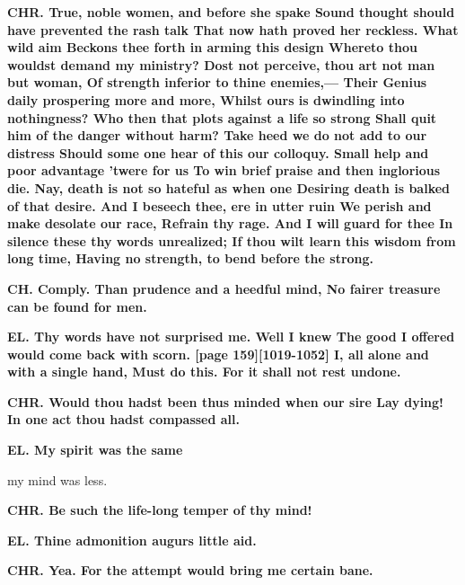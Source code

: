 \documentclass[11pt,letter]{book}
\begin{document}
\par \textbf{CHR. True, noble women, and before she spake Sound thought should have prevented the rash talk That now hath proved her reckless. What wild aim Beckons thee forth in arming this design Whereto thou wouldst demand my ministry? Dost not perceive, thou art not man but woman, Of strength inferior to thine enemies,— Their Genius daily prospering more and more, Whilst ours is dwindling into nothingness? Who then that plots against a life so strong Shall quit him of the danger without harm? Take heed we do not add to our distress Should some one hear of this our colloquy. Small help and poor advantage ’twere for us To win brief praise and then inglorious die. Nay, death is not so hateful as when one Desiring death is balked of that desire. And I beseech thee, ere in utter ruin We perish and make desolate our race, Refrain thy rage. And I will guard for thee In silence these thy words unrealized; If thou wilt learn this wisdom from long time, Having no strength, to bend before the strong.}
\par 

\par \textbf{CH. Comply. Than prudence and a heedful mind, No fairer treasure can be found for men.}
\par 

\par \textbf{EL. Thy words have not surprised me. Well I knew The good I offered would come back with scorn. [page 159][1019-1052] I, all alone and with a single hand, Must do this. For it shall not rest undone.}
\par 

\par \textbf{CHR. Would thou hadst been thus minded when our sire Lay dying! In one act thou hadst compassed all.}
\par 

\par \textbf{EL. My spirit was the same}
\par   my mind was less.

\par \textbf{CHR. Be such the life-long temper of thy mind!}
\par 

\par \textbf{EL. Thine admonition augurs little aid.}
\par 

\par \textbf{CHR. Yea. For the attempt would bring me certain bane.}
\par 
\end{document}
